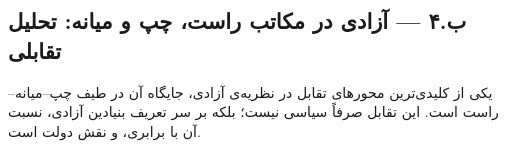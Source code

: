 \newpage

\subsection{ب.۴ — آزادی در مکاتب راست، چپ و میانه: تحلیل تقابلی}
\label{subsec:left_right_center}

\begin{tcolorbox}[defbox, title={چارچوب تحلیل}]
یکی از کلیدی‌ترین محورهای تقابل در نظریه‌ی آزادی، جایگاه آن در طیف چپ–میانه–راست است. این تقابل صرفاً سیاسی نیست؛ بلکه بر سر تعریف بنیادین آزادی، نسبت آن با برابری، و نقش دولت است.
\end{tcolorbox}

\vspace{0.4cm}

